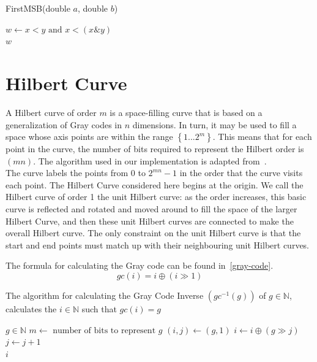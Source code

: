 \documentclass[10pt]{article}
\begin{document}
\begin{algorithm}
  \caption{FirstMSB(double $a$, double $b$)}
  \label{first-msb}
  \begin{algorithmic}[1]
    \State $w \leftarrow x < y \text{ and } x < (x \mathrel{\&} y)$ \\
    \Return $w$
  \end{algorithmic}
\end{algorithm}

\section{Hilbert Curve}

A Hilbert curve of order $m$ is a space-filling curve that is based on a generalization of Gray codes in $n$ dimensions. In turn, it may be used to fill a space whose axis points are within the range $\left\{{1...2^m}\right\}$. This means that for each point in the curve, the number of bits required to represent the Hilbert order is $(mn)$. The algorithm used in our implementation is adapted from~\cite{Hamilton:2006}. \\

The curve labels the points from $0$ to $2^{mn} - 1$ in the order that the curve visits each point. The Hilbert Curve considered here begins at the origin. We call the Hilbert curve of order 1 the unit Hilbert curve: as the order increases, this basic curve is reflected and rotated and moved around to fill the space of the larger Hilbert Curve, and then these unit Hilbert curves are connected to make the overall Hilbert curve. The only constraint on the unit Hilbert curve is that the start and end points must match up with their neighbouring unit Hilbert curves.

\flushleft
The formula for calculating the Gray code can be found in~\ref{gray-code}.
\begin{equation}
  \label{gray-code}
  gc(i) = i \oplus \left( i \gg 1 \right) 
\end{equation}

\begin{algorithm}
  \caption{The algorithm for calculating the Gray Code Inverse $(gc^{-1}(g))$ of $g \in \mathbb{N}$, calculates the $i \in \mathbb{N}$ such that $gc\left( i \right) = g $ }
  \label{gray-code-inverse}
  \begin{algorithmic}[1]
    \Require $g \in \mathbb{N}$ 
    \State $ m \leftarrow \text{ number of bits to represent } g$ 
    \State $ \left( i, j \right) \leftarrow \left( g, 1 \right) $ 
    \State $ i \leftarrow i \oplus \left( g \gg j \right)$ 
    \State $ j \leftarrow j + 1$ 
    \EndWhile \\
    \Return $i$ %
  \end{algorithmic}
\end{algorithm}
\end{document}
